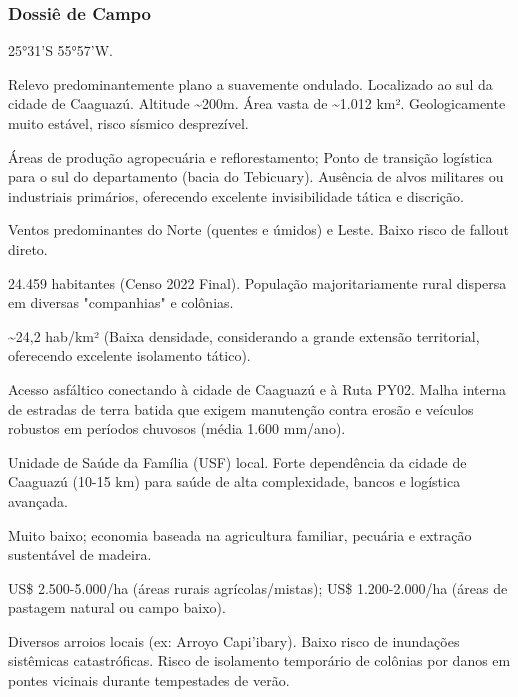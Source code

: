 \subsubsection{Dossiê de Campo}
\begin{description}[style=nextline,leftmargin=0.5cm,font=\bfseries]
\item[Coordenadas]  25°31'S 55°57'W.
\item[Topografia]  Relevo predominantemente plano a suavemente ondulado. Localizado ao sul da cidade de Caaguazú. Altitude \textasciitilde 200m. Área vasta de \textasciitilde 1.012 km². Geologicamente muito estável, risco sísmico desprezível.
\item[Alvos Estratégicos]  Áreas de produção agropecuária e reflorestamento; Ponto de transição logística para o sul do departamento (bacia do Tebicuary). Ausência de alvos militares ou industriais primários, oferecendo excelente invisibilidade tática e discrição.
\item[Fallout]  Ventos predominantes do Norte (quentes e úmidos) e Leste. Baixo risco de fallout direto.
\item[População]  24.459 habitantes (Censo 2022 Final). População majoritariamente rural dispersa em diversas "companhias" e colônias.
\item[Densidade]  \textasciitilde 24,2 hab/\allowbreak km² (Baixa densidade, considerando a grande extensão territorial, oferecendo excelente isolamento tático).
\item[Vias de Acesso]  Acesso asfáltico conectando à cidade de Caaguazú e à Ruta PY02. Malha interna de estradas de terra batida que exigem manutenção contra erosão e veículos robustos em períodos chuvosos (média 1.600 mm/\allowbreak ano).
\item[Serviços]  Unidade de Saúde da Família (USF) local. Forte dependência da cidade de Caaguazú (10-15 km) para saúde de alta complexidade, bancos e logística avançada.
\item[Custo de Vida]  Muito baixo; economia baseada na agricultura familiar, pecuária e extração sustentável de madeira.
\item[Preço da Terra]  US\$ 2.500-5.000/\allowbreak ha (áreas rurais agrícolas/\allowbreak mistas); US\$ 1.200-2.000/\allowbreak ha (áreas de pastagem natural ou campo baixo).
\item[Hidrologia]  Diversos arroios locais (ex: Arroyo Capi'ibary). Baixo risco de inundações sistêmicas catastróficas. Risco de isolamento temporário de colônias por danos em pontes vicinais durante tempestades de verão.

\end{description}
